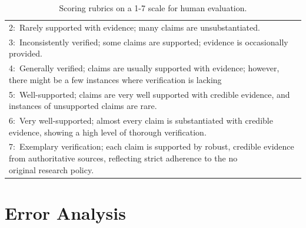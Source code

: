 \documentclass[11pt]{article}
\begin{document}
\begin{table}
{\begin{tabular}{l}
2:~Rarely supported with evidence; many claims are unsubstantiated.                                                                                                                          \\
3:~Inconsistently verified; some claims are supported; evidence is occasionally provided.                                                                                                    \\
4:~Generally verified; claims are usually supported with evidence; however, there might be a few instances where verification is lacking                                                     \\
5:~Well-supported; claims are very well supported with credible evidence, and instances of unsupported claims are rare.                                                                      \\
6:~Very well-supported; almost every claim is substantiated with credible evidence, showing a high level of thorough verification.                                                           \\
\makecell[l]{7:~Exemplary verification; each claim is supported by robust, credible evidence from authoritative sources, reflecting strict adherence to the no \\original research policy.}                  \\
\bottomrule
\end{tabular}
}
\caption{Scoring rubrics on a 1-7 scale for human evaluation.}
\label{table:human_eval_rubric}
\end{table}



\section{Error Analysis}
\label{appendix:error_analysis}
\end{document}
